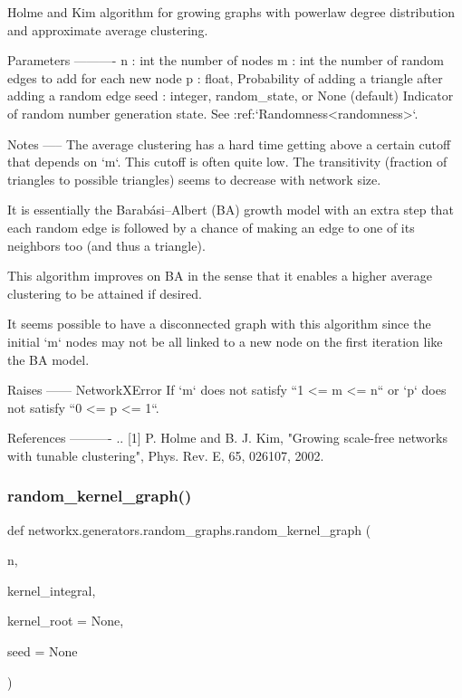 \begin{DoxyVerb}Holme and Kim algorithm for growing graphs with powerlaw
degree distribution and approximate average clustering.

Parameters
----------
n : int
    the number of nodes
m : int
    the number of random edges to add for each new node
p : float,
    Probability of adding a triangle after adding a random edge
seed : integer, random_state, or None (default)
    Indicator of random number generation state.
    See :ref:`Randomness<randomness>`.

Notes
-----
The average clustering has a hard time getting above a certain
cutoff that depends on `m`.  This cutoff is often quite low.  The
transitivity (fraction of triangles to possible triangles) seems to
decrease with network size.

It is essentially the Barabási–Albert (BA) growth model with an
extra step that each random edge is followed by a chance of
making an edge to one of its neighbors too (and thus a triangle).

This algorithm improves on BA in the sense that it enables a
higher average clustering to be attained if desired.

It seems possible to have a disconnected graph with this algorithm
since the initial `m` nodes may not be all linked to a new node
on the first iteration like the BA model.

Raises
------
NetworkXError
    If `m` does not satisfy ``1 <= m <= n`` or `p` does not
    satisfy ``0 <= p <= 1``.

References
----------
.. [1] P. Holme and B. J. Kim,
   "Growing scale-free networks with tunable clustering",
   Phys. Rev. E, 65, 026107, 2002.
\end{DoxyVerb}
 \mbox{\label{namespacenetworkx_1_1generators_1_1random__graphs_a00602f80081a0a81a58385f95299f594}} 
\subsubsection{\texorpdfstring{random\+\_\+kernel\+\_\+graph()}{random\_kernel\_graph()}}
{\footnotesize\ttfamily def networkx.\+generators.\+random\+\_\+graphs.\+random\+\_\+kernel\+\_\+graph (\begin{DoxyParamCaption}\item[{}]{n,  }\item[{}]{kernel\+\_\+integral,  }\item[{}]{kernel\+\_\+root = {\ttfamily None},  }\item[{}]{seed = {\ttfamily None} }\end{DoxyParamCaption})}


